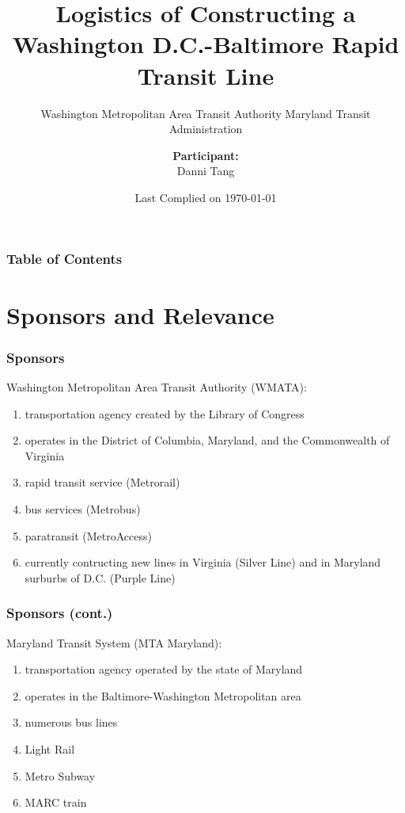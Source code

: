 \documentclass[compress,handout,10pt]{beamer}
\title{{\color{blue} \LARGE Logistics of Constructing a Washington D.C.-Baltimore Rapid Transit Line\newline} }
\subtitle{{\large Washington Metropolitan Area Transit Authority \newline \large Maryland Transit Administration} }
\author{ 
    {\bf{Participant:}} \\ 
Danni Tang \\ 
    \vspace{5pt}
}
\institute{Johs Hopkins University}
\date{\mygreen Last Complied on \today}
\let\olditem\item
\renewcommand{\item}{\setlength{\itemsep}{0.5\baselineskip}\olditem}
\begin{document}
\begin{frame}[plain]
    \titlepage
\end{frame}

\begin{frame}
    \frametitle{Table of Contents}
    \tableofcontents
\end{frame}

\section{Sponsors and Relevance}

\begin{frame}
    \frametitle{Sponsors}
    Washington Metropolitan Area Transit Authority (WMATA):
    \vspace{7pt}
             \begin{enumerate}
                 \item transportation agency created by the Library of Congress
		 \item operates in the District of Columbia, Maryland, and the Commonwealth of Virginia
                 \item rapid transit service (Metrorail)
                 \item bus services (Metrobus)
                 \item paratransit (MetroAccess)
                 \item currently contructing new lines in Virginia (Silver Line) and in Maryland surburbs of D.C. (Purple Line)
             \end{enumerate}
\end{frame}

\begin{frame}
    \frametitle{Sponsors (cont.)}
    Maryland Transit System (MTA Maryland):
    \vspace{7pt}
             \begin{enumerate}
                 \item transportation agency operated by the state of Maryland
                 \item operates in the Baltimore-Washington Metropolitan area
                 \item numerous bus lines
                 \item Light Rail
                 \item Metro Subway
		 \item MARC train
             \end{enumerate}
\end{frame}
\end{document}
